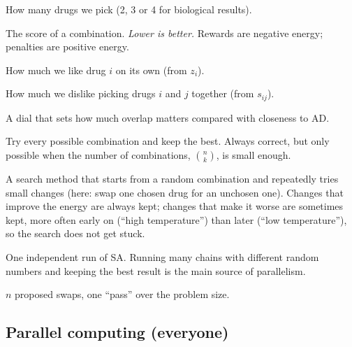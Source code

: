 \begin{description}[leftmargin=0.4cm,style=nextline]
\item[Combination size $k$] How many drugs we pick (2, 3 or 4 for biological results).
\item[Energy $E$] The score of a combination. \emph{Lower is better.} Rewards are negative energy; penalties are positive energy.
\item[Reward $w_i$] How much we like drug $i$ on its own (from $z_i$).
\item[Penalty $P_{ij}$] How much we dislike picking drugs $i$ and $j$ together (from $s_{ij}$).
\item[$\lambda$ (lambda)] A dial that sets how much overlap matters compared with closeness to AD.
\item[Exact search / enumeration] Try every possible combination and keep the best. Always correct, but only possible when the number of combinations, $\binom{n}{k}$, is small enough.
\item[Simulated annealing (SA)] A search method that starts from a random combination and repeatedly tries small changes (here: swap one chosen drug for an unchosen one). Changes that improve the energy are always kept; changes that make it worse are sometimes kept, more often early on (``high temperature'') than later (``low temperature''), so the search does not get stuck.
\item[Chain / replica] One independent run of SA. Running many chains with different random numbers and keeping the best result is the main source of parallelism.
\item[Sweep] $n$ proposed swaps, one ``pass'' over the problem size.
\end{description}

\subsection{Parallel computing (everyone)}

